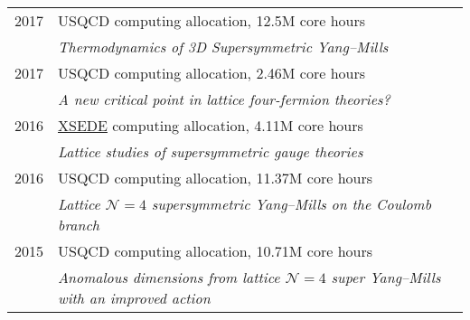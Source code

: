 \begin{spacelist}
\begin{tabular}[t]{cl}
      2017 & USQCD computing allocation, 12.5M core hours                                                                                                                                                                              \\ %
           & \textit{Thermodynamics of 3D Supersymmetric Yang--Mills}                                                                                                                                                                  \\[6 pt]
      2017 & USQCD computing allocation, 2.46M core hours                                                                                                                                                                              \\ %
           & \textit{A new critical point in lattice four-fermion theories?}                                                                                                                                                           \\[6 pt]
      2016 & \href{http://www.xsede.org}{XSEDE} computing allocation, 4.11M core hours                                                                                                                                                 \\ %
           & \textit{Lattice studies of supersymmetric gauge theories}                                                                                                                                                                 \\[6 pt]
      2016 & USQCD computing allocation, 11.37M core hours                                                                                                                                                                             \\ %
           & \textit{Lattice $\mathcal N = 4$ supersymmetric Yang--Mills on the Coulomb branch}                                                                                                                                        \\[6 pt]
      2015 & USQCD computing allocation, 10.71M core hours                                                                                                                                                                             \\ %
           & \textit{Anomalous dimensions from lattice $\mathcal N = 4$ super Yang--Mills with an improved action}                                                                                                                     \\[6 pt]

\end{tabular}
\end{spacelist}
